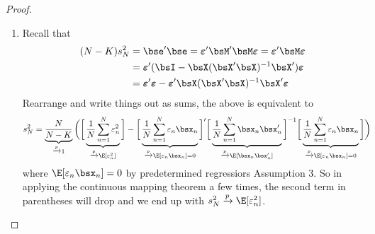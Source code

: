 \documentclass[12pt]{article}
\theoremstyle{plain}
\theoremstyle{definition}
\theoremstyle{remark}
\newcommand{\bsvarepsilon}{\boldsymbol{\varepsilon}}
\newcommand{\pto}{\xrightarrow{p}}
\newcommand{\sumnN}{\sum^N_{n=1}}
\begin{document}
\begin{proof}
\begin{enumerate}
  \item
    Recall that
    \begin{align*}
      (N-K) s^2_N
      &= \bse' \bse
      = \bsvarepsilon'\bsM' \bsM\bsvarepsilon
      = \bsvarepsilon'\bsM\bsvarepsilon \\
      &= \bsvarepsilon'(\bsI - \bsX(\bsX'\bsX)^{-1}\bsX')\bsvarepsilon
      \\
      &= \bsvarepsilon'\bsvarepsilon
        - \bsvarepsilon'\bsX(\bsX'\bsX)^{-1}\bsX'\bsvarepsilon \\
    \end{align*}
    Rearrange and write things out as sums, the above is equivalent to
    \begin{align}
      s^2_N
      &= \underbrace{\frac{N}{N-K}}_{\pto 1}
      \bigg(
        \bigg[
        \underbrace{\frac{1}{N} \sumnN \varepsilon_n^2}_{%
          \pto \E[\varepsilon^2_n]}
         \bigg]
        - \bigg[
        \underbrace{\frac{1}{N} \sumnN \varepsilon_n \bsx_n}_{%
          \pto\E[\varepsilon_n\bsx_n]=0}
        \bigg]'
        \bigg[
        \underbrace{\frac{1}{N} \sumnN \bsx_n\bsx_n'}_{%
          \pto \E[\bsx_n\bsx_n']}
        \bigg]^{-1}
        \bigg[
        \underbrace{\frac{1}{N} \sumnN \varepsilon_n \bsx_n}_{%
          \pto\E[\varepsilon_n\bsx_n]=0}
        \bigg]
      \bigg)
      \label{s2consistent}
    \end{align}
    where $\E[\varepsilon_n\bsx_n]=0$ by predetermined regressiors
    Assumption 3. So in applying the continuous mapping theorem a few
    times, the second term in parentheses will drop and we end up with
    $s^2_N\pto \E[\varepsilon_n^2]$.


\end{enumerate}
\end{proof}
\end{document}
